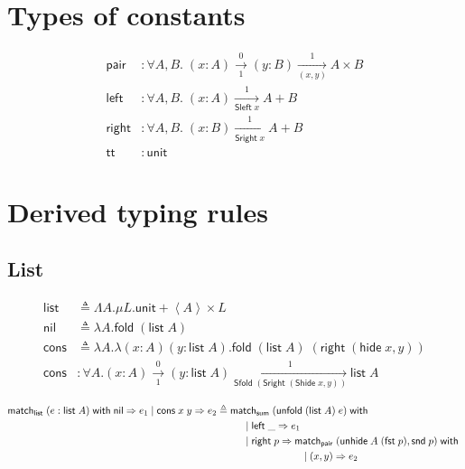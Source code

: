\documentclass{article}
\newcommand{\thide}[1]{\left \langle #1 \right \rangle}
\newcommand{\arrow}[4]{#1\xrightarrow[#3]{#2}#4}
\newcommand{\symmatch}{\mathsf{match}}
\newcommand{\symwith}{\mathsf{\;with\;}}
\newcommand{\symleft}{\mathsf{left}}
\newcommand{\symright}{\mathsf{right}}
\newcommand{\symSleft}{\mathsf{Sleft\;}}
\newcommand{\symSright}{\mathsf{Sright\;}}
\newcommand{\symfold}{\mathsf{fold\;}}
\newcommand{\symSfold}{\mathsf{Sfold\;}}
\newcommand{\symunfold}{\mathsf{unfold\;}}
\newcommand{\symhide}{\mathsf{hide\;}}
\newcommand{\symShide}{\mathsf{Shide\;}}
\newcommand{\symunhide}{\mathsf{unhide\;}}
\newcommand{\sympair}{\mathsf{pair}}
\newcommand{\symtt}{\mathsf{tt}}
\newcommand{\symunit}{\mathsf{unit}}
\newcommand{\symlist}{\mathsf{list}}
\newcommand{\symnil}{\mathsf{nil}}
\newcommand{\symcons}{\mathsf{cons}}
\newcommand{\intro}[2]{(#1 : #2)}
\newcommand{\symsum}{\mathsf{sum}}
\newcommand{\symfst}{\mathsf{fst}}
\newcommand{\symsnd}{\mathsf{snd}}
\newcommand{\defeq}{\triangleq}
\begin{document}
\section{Types of constants}

\begin{align*}
\sympair&:\forall A,B.\;\arrow{\intro{x}{A}}{0}{1}{\arrow{\intro{y}{B}}{1}{(x,y)}{A\times B}} \\
\symleft&:\forall A,B.\;\arrow{\intro{x}{A}}{1}{\symSleft x}{A+B} \\
\symright&:\forall A,B.\;\arrow{\intro{x}{B}}{1}{\symSright x}{A+B} \\
\symtt&:\symunit
\end{align*}

\section{Derived typing rules}

\subsection{List}

\begin{align*}
\symlist &\defeq \Lambda A. \mu L. \symunit + \thide{A} \times L \\
\symnil &\defeq \lambda A. \symfold (\symlist\;A) \\
\symcons &\defeq \lambda A. \lambda(x : A)(y : \symlist\;A). \symfold (\symlist\;A)\;(\symright\;(\symhide x,y)) \\
\symcons &: \forall A. \arrow{\intro{x}{A}}{0}{1}{\arrow{\intro{y}{\symlist\;A}}{1}{\symSfold (\symSright (\symShide x, y))}{\symlist\;A}} 
\end{align*}

\begin{align*}
\symmatch_\symlist\; (e : \symlist\;A) \symwith \symnil \Rightarrow e_1 \;|\; \symcons\;x\;y \Rightarrow e_2 
  & \defeq \symmatch_\symsum\;(\symunfold (\symlist\;A)\;e) \symwith \\
  & \hspace{0.4in} |\;\symleft\;\_ \Rightarrow e_1 \\
  & \hspace{0.4in} |\; \symright\;p \Rightarrow \symmatch_\sympair\;(\symunhide A\;(\symfst\;p),\symsnd\;p)\symwith \\
  & \hspace{1.2in} |\; (x,y) \Rightarrow e_2
\end{align*}
\end{document}
